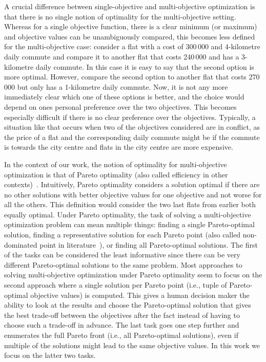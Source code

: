 A crucial difference between single-objective and multi-objective optimization is that there is no single notion of optimality for the multi-objective setting.
Whereas for a single objective function, there is a clear minimum (or maximum) and objective values can be unambiguously compared, this becomes less defined for the multi-objective case:
consider a flat with a cost of 300\,000 \texteuro{} and 4-kilometre daily commute and compare it to another flat that costs 240\,000 \texteuro{} and has a 3-kilometre daily commute.
In this case it is easy to say that the second option is more optimal.
However, compare the second option to another flat that costs 270\,000 \texteuro{} but only has a 1-kilometre daily commute.
Now, it is not any more immediately clear which one of these options is better, and the choice would depend on ones personal preference over the two objectives.
This becomes especially difficult if there is no clear preference over the objectives.
Typically, a situation like that occurs when two of the objectives considered are in conflict, as the price of a flat and the corresponding daily commute might be if the commute is towards the city centre and flats in the city centre are more expensive.

In the context of our work, the notion of optimality for multi-objective optimization is that of Pareto optimality (also called efficiency in other contexts)~\autocite{Ehrgott2005-2}.
Intuitively, Pareto optimality considers a solution optimal if there are no other solutions with better objective values for one objective and not worse for all the others. 
This definition would consider the two last flats from earlier both equally optimal.
Under Pareto optimality, the task of solving a multi-objective optimization problem can mean multiple things:
finding a single Pareto-optimal solution, finding a representative solution for each Pareto point (also called non-dominated point in literature~\autocite{Ehrgott2005-2}), or finding all Pareto-optimal solutions.
The first of the tasks can be considered the least informative since there can be very different Pareto-optimal solutions to the same problem.
Most approaches to solving multi-objective optimization under Pareto optimality seem to focus on the second approach where a single solution per Pareto point (i.e., tuple of Pareto-optimal objective values) is computed.
This gives a human decision maker the ability to look at the results and choose the Pareto-optimal solution that gives the best trade-off between the objectives after the fact instead of having to choose such a trade-off in advance.
The last task goes one step further and enumerates the full Pareto front (i.e., all Pareto-optimal solutions), even if multiple of the solutions might lead to the same objective values.
In this work we focus on the latter two tasks.

